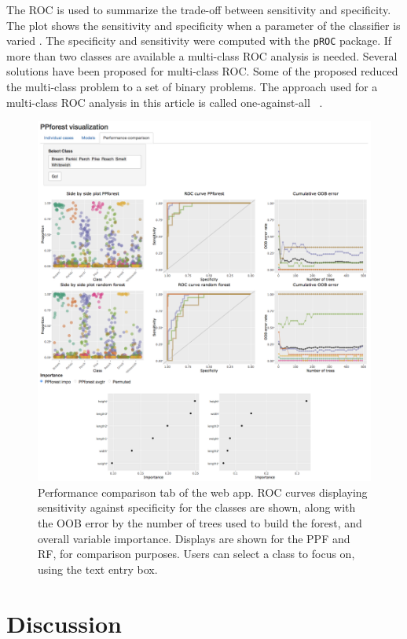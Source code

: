 \documentclass[smallextended,natbib]{svjour3}\usepackage[]{graphicx}\usepackage[]{xcolor}
\begin{document}
The  ROC is used to summarize the trade-off between sensitivity and specificity. The plot shows the sensitivity and specificity when a parameter of the classifier is varied \citep{trevor2011elements}. The specificity and sensitivity were computed with the \verb#pROC# package.
If more than two classes are available a multi-class ROC analysis is needed. Several solutions have been proposed for multi-class ROC. Some of the proposed reduced the multi-class problem to a set of binary problems. The approach used for a multi-class ROC analysis in this article is called one-against-all ~\citep{allwein2000reducing}.

\begin{figure}[hbpt]
\includegraphics[width=.8\linewidth]{fish31.png}
\caption{Performance comparison tab of the web app. ROC curves displaying sensitivity against specificity for the classes are shown, along with the OOB error by the number of trees used to build the forest, and overall variable importance. Displays are shown for the PPF and RF, for comparison purposes. Users can select a class to focus on, using the text entry box. \label{tab3}}
\end{figure}
\newpage

\section{Discussion}\label{fur}
\end{document}
